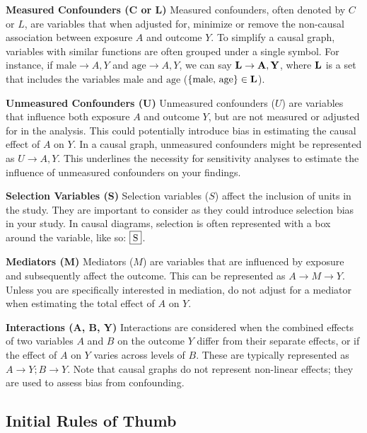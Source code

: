 \documentclass[
  singlecolumn]{report}
\begin{document}
\textbf{Measured Confounders (C or L)} Measured confounders, often
denoted by \(C\) or \(L\), are variables that when adjusted for,
minimize or remove the non-causal association between exposure \(A\) and
outcome \(Y\). To simplify a causal graph, variables with similar
functions are often grouped under a single symbol. For instance, if
\(\text{male} \to A, Y\) and \(\text{age} \to A, Y\), we can say
\(\bf{L} \to A, Y\), where \(\bf{L}\) is a set that includes the
variables \(\text{male}\) and \(\text{age}\)
(\(\{\text{male, age}\}\in \bf{L}\)).

\textbf{Unmeasured Confounders (U)} Unmeasured confounders (\(U\)) are
variables that influence both exposure \(A\) and outcome \(Y\), but are
not measured or adjusted for in the analysis. This could potentially
introduce bias in estimating the causal effect of \(A\) on \(Y\). In a
causal graph, unmeasured confounders might be represented as
\(U \to A, Y\). This underlines the necessity for sensitivity analyses
to estimate the influence of unmeasured confounders on your findings.

\textbf{Selection Variables (S)} Selection variables (\(S\)) affect the
inclusion of units in the study. They are important to consider as they
could introduce selection bias in your study. In causal diagrams,
selection is often represented with a box around the variable, like so:
\(\framebox{S}\).

\textbf{Mediators (M)} Mediators (\(M\)) are variables that are
influenced by exposure and subsequently affect the outcome. This can be
represented as \(A \to M \to Y\). Unless you are specifically interested
in mediation, do not adjust for a mediator when estimating the total
effect of \(A\) on \(Y\).

\textbf{Interactions (A, B, Y)} Interactions are considered when the
combined effects of two variables \(A\) and \(B\) on the outcome \(Y\)
differ from their separate effects, or if the effect of \(A\) on \(Y\)
varies across levels of \(B\). These are typically represented as
\(A \to Y; B \to Y\). Note that causal graphs do not represent
non-linear effects; they are used to assess bias from confounding.

\hypertarget{initial-rules-of-thumb}{%
\subsection{Initial Rules of Thumb}\label{initial-rules-of-thumb}}
\end{document}
